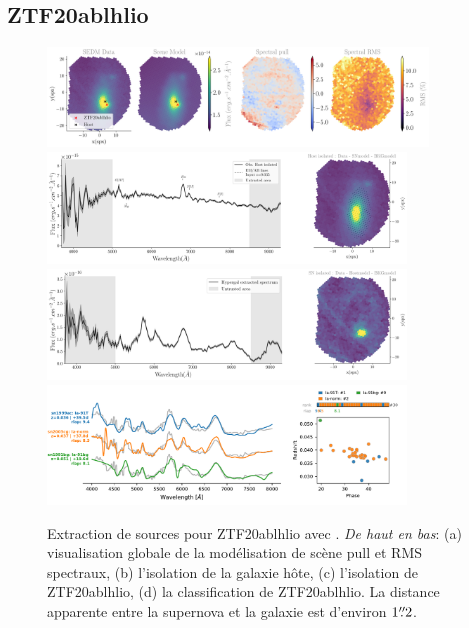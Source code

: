 \documentclass[../main/main.tex]{subfiles}
\begin{document}
\subsection{ZTF20ablhlio}
\begin{figure}[ht]
  \centering
  \includegraphics[width=0.9\textwidth]{../figures/07_scene/scene_rmspull_ZTF20ablhlio.png}
  \includegraphics[width=0.85\textwidth]{../figures/07_scene/output_host_ZTF20ablhlio.png}
  \includegraphics[width=0.85\textwidth]{../figures/07_scene/output_target_ZTF20ablhlio.png}
  \includegraphics[width=0.85\textwidth]{../figures/07_scene/ZTF20ablhlio_snid_typing.pdf}
  \caption[Extraction de sources pour ZTF19acbjlnt.]{Extraction de
    sources pour ZTF20ablhlio avec \hypergal. \emph{De haut en bas}:
    (a) visualisation globale de la modélisation de scène pull et RMS
    spectraux, (b) l'isolation de la galaxie hôte, (c) l'isolation de
    ZTF20ablhlio, (d) la classification de ZTF20ablhlio. La distance apparente entre la
supernova et la galaxie est d'environ $1\overset{\prime\prime}{.}2$.}
  \label{}
\end{figure}

\restoregeometry

%
%
\end{document}

